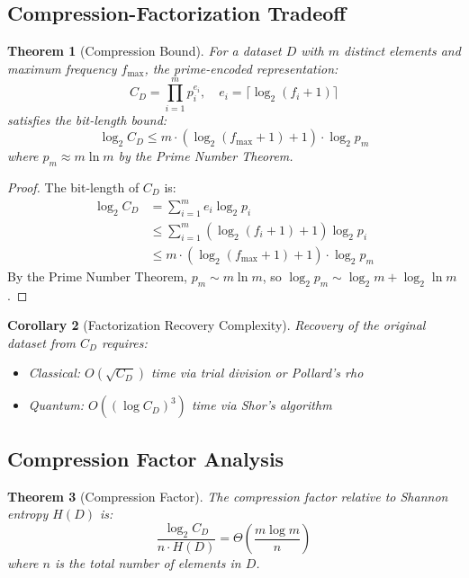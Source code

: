 \documentclass[12pt,a4paper]{article}
\newtheorem{theorem}{Theorem}[section]
\newtheorem{corollary}[theorem]{Corollary}
\begin{document}
\subsection{Compression-Factorization Tradeoff}

\begin{theorem}[Compression Bound]
\label{thm:compression}
For a dataset $D$ with $m$ distinct elements and maximum frequency $f_{\max}$, the prime-encoded representation:
\begin{equation}
    C_D = \prod_{i=1}^{m} p_i^{e_i}, \quad e_i = \lceil \log_2(f_i + 1) \rceil
\end{equation}
satisfies the bit-length bound:
\begin{equation}
    \log_2 C_D \leq m \cdot (\log_2(f_{\max} + 1) + 1) \cdot \log_2 p_m
\end{equation}
where $p_m \approx m \ln m$ by the Prime Number Theorem.
\end{theorem}

\begin{proof}
The bit-length of $C_D$ is:
\begin{align}
    \log_2 C_D &= \sum_{i=1}^{m} e_i \log_2 p_i \\
    &\leq \sum_{i=1}^{m} (\log_2(f_i + 1) + 1) \log_2 p_i \\
    &\leq m \cdot (\log_2(f_{\max} + 1) + 1) \cdot \log_2 p_m
\end{align}
By the Prime Number Theorem, $p_m \sim m \ln m$, so $\log_2 p_m \sim \log_2 m + \log_2 \ln m$.
\end{proof}

\begin{corollary}[Factorization Recovery Complexity]
Recovery of the original dataset from $C_D$ requires:
\begin{itemize}
    \item Classical: $O(\sqrt{C_D})$ time via trial division or Pollard's rho
    \item Quantum: $O((\log C_D)^3)$ time via Shor's algorithm
\end{itemize}
\end{corollary}

\subsection{Compression Factor Analysis}

\begin{theorem}[Compression Factor]
The compression factor relative to Shannon entropy $H(D)$ is:
\begin{equation}
    \frac{\log_2 C_D}{n \cdot H(D)} = \Theta\left(\frac{m \log m}{n}\right)
\end{equation}
where $n$ is the total number of elements in $D$.
\end{theorem}
\end{document}
